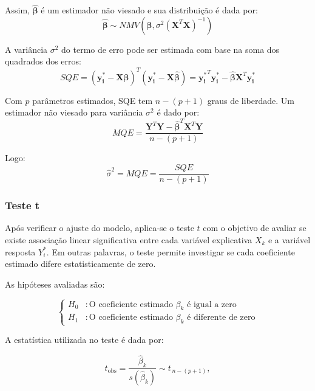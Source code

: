 \documentclass[12pt,a4paper,header]{abnt}
\begin{document}
Assim, \( \hat{\boldsymbol{\beta}} \) é um estimador não viesado e sua distribuição é dada por:
\begin{equation}
    \hat{\boldsymbol{\beta}} \sim NMV(\boldsymbol{\beta}, \sigma^2 (\mathbf{X}^T \mathbf{X})^{-1})
\end{equation}

A variância \( \sigma^2 \) do termo de erro pode ser estimada com base na soma dos quadrados dos erros:
\begin{equation}
    SQE = (\mathbf{y_i^*} - \mathbf{X} \hat{\boldsymbol{\beta}})^T (\mathbf{y_i^*} - \mathbf{X} \hat{\boldsymbol{\beta}}) = \mathbf{y_i^*}^T \mathbf{y_i^*} - \hat{\boldsymbol{\beta}} \mathbf{X}^T \mathbf{y_i^*}
\end{equation}

Com \( p \) parâmetros estimados, SQE tem $n-(p+1)$ graus de liberdade. Um estimador não viesado para variância \( \sigma^2 \) é dado por:
\begin{equation}
    MQE = \frac{\mathbf{Y}^T \mathbf{Y} - \hat{\boldsymbol{\beta}}^T \mathbf{X}^T \mathbf{Y}}{n - (p+1)}
\end{equation}

Logo:
\begin{equation}
    \hat{\sigma}^2 = MQE = \frac{SQE}{n - (p+1)}
\end{equation}


\subsubsection{Teste t}
Após verificar o ajuste do modelo, aplica-se o teste $t$ com o objetivo de avaliar se existe associação linear significativa entre cada variável explicativa \(X_k\) e a variável resposta \(Y_i^*\). Em outras palavras, o teste permite investigar se cada coeficiente estimado difere estatisticamente de zero.

As hipóteses avaliadas são:

\[
\left\{
\begin{aligned}
\text{$H$}_0 &: \text{O coeficiente estimado } \beta_k \text{ é igual a zero} \\
\text{$H$}_1 &: \text{O coeficiente estimado } \beta_k \text{ é diferente de zero}
\end{aligned}
\right.
\]

A estatística utilizada no teste é dada por:

\[
t_{\text{obs}} = \frac{\hat{\beta}_k}{s(\hat{\beta}_k)} \sim t_{\,n-(p+1)},
\]
\end{document}
